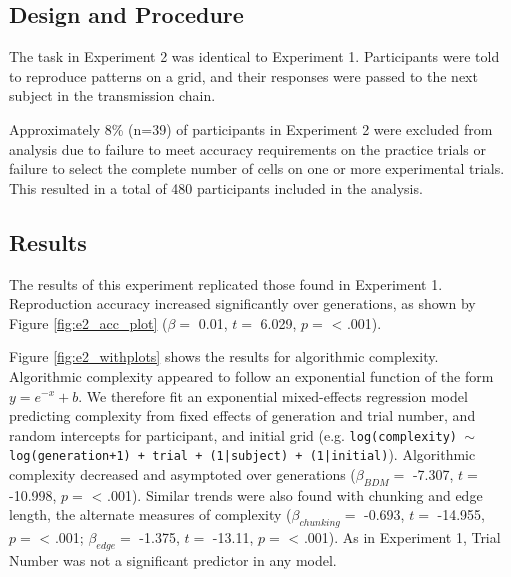 \documentclass[10pt, letterpaper]{article}
\begin{document}
\subsection{Design and Procedure}\label{design-and-procedure-1}

The task in Experiment 2 was identical to Experiment 1. Participants
were told to reproduce patterns on a grid, and their responses were
passed to the next subject in the transmission chain.

Approximately 8\% (n=39) of participants in Experiment 2 were excluded
from analysis due to failure to meet accuracy requirements on the
practice trials or failure to select the complete number of cells on one
or more experimental trials. This resulted in a total of 480
participants included in the analysis.

\subsection{Results}\label{results}

The results of this experiment replicated those found in Experiment 1.
Reproduction accuracy increased significantly over generations, as shown
by Figure \ref{fig:e2_acc_plot} (\(\beta =\) 0.01, \(t =\) 6.029,
\(p =\) \textless{} .001).

Figure \ref{fig:e2_withplots} shows the results for algorithmic
complexity. Algorithmic complexity appeared to follow an exponential
function of the form \(y = e^{-x} + b\). We therefore fit an exponential
mixed-effects regression model predicting complexity from fixed effects
of generation and trial number, and random intercepts for participant,
and initial grid (e.g.
\texttt{log(complexity) $\sim$ log(generation+1) + trial + (1|subject) + (1|initial)}).
Algorithmic complexity decreased and asymptoted over generations
(\(\beta_{BDM} =\) -7.307, \(t =\) -10.998, \(p =\) \textless{} .001).
Similar trends were also found with chunking and edge length, the
alternate measures of complexity (\(\beta_{chunking} =\) -0.693, \(t =\)
-14.955, \(p =\) \textless{} .001; \(\beta_{edge} =\) -1.375, \(t =\)
-13.11, \(p =\) \textless{} .001). As in Experiment 1, Trial Number was
not a significant predictor in any model.
\end{document}
